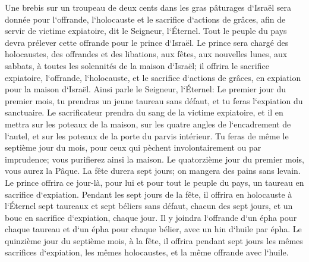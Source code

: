 \verse Une brebis sur un troupeau de deux cents dans les gras pâturages d`Israël sera donnée pour l`offrande, l`holocauste et le sacrifice d`actions de grâces, afin de servir de victime expiatoire, dit le Seigneur, l`Éternel. 
\verse Tout le peuple du pays devra prélever cette offrande pour le prince d`Israël. 
\verse Le prince sera chargé des holocaustes, des offrandes et des libations, aux fêtes, aux nouvelles lunes, aux sabbats, à toutes les solennités de la maison d`Israël; il offrira le sacrifice expiatoire, l`offrande, l`holocauste, et le sacrifice d`actions de grâces, en expiation pour la maison d`Israël. 
\verse Ainsi parle le Seigneur, l`Éternel: Le premier jour du premier mois, tu prendras un jeune taureau sans défaut, et tu feras l`expiation du sanctuaire. 
\verse Le sacrificateur prendra du sang de la victime expiatoire, et il en mettra sur les poteaux de la maison, sur les quatre angles de l`encadrement de l`autel, et sur les poteaux de la porte du parvis intérieur. 
\verse Tu feras de même le septième jour du mois, pour ceux qui pèchent involontairement ou par imprudence; vous purifierez ainsi la maison. 
\verse Le quatorzième jour du premier mois, vous aurez la Pâque. La fête durera sept jours; on mangera des pains sans levain. 
\verse Le prince offrira ce jour-là, pour lui et pour tout le peuple du pays, un taureau en sacrifice d`expiation. 
\verse Pendant les sept jours de la fête, il offrira en holocauste à l`Éternel sept taureaux et sept béliers sans défaut, chacun des sept jours, et un bouc en sacrifice d`expiation, chaque jour. 
\verse Il y joindra l`offrande d`un épha pour chaque taureau et d`un épha pour chaque bélier, avec un hin d`huile par épha. 
\verse Le quinzième jour du septième mois, à la fête, il offrira pendant sept jours les mêmes sacrifices d`expiation, les mêmes holocaustes, et la même offrande avec l`huile. 

